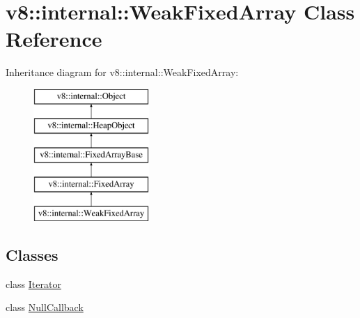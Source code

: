 \hypertarget{classv8_1_1internal_1_1_weak_fixed_array}{}\section{v8\+:\+:internal\+:\+:Weak\+Fixed\+Array Class Reference}
\label{classv8_1_1internal_1_1_weak_fixed_array}
Inheritance diagram for v8\+:\+:internal\+:\+:Weak\+Fixed\+Array\+:\begin{figure}[H]
\begin{center}
\leavevmode
\includegraphics[height=5.000000cm]{classv8_1_1internal_1_1_weak_fixed_array}
\end{center}
\end{figure}
\subsection*{Classes}
\begin{DoxyCompactItemize}
\item 
class \hyperlink{classv8_1_1internal_1_1_weak_fixed_array_1_1_iterator}{Iterator}
\item 
class \hyperlink{classv8_1_1internal_1_1_weak_fixed_array_1_1_null_callback}{Null\+Callback}
\end{DoxyCompactItemize}
